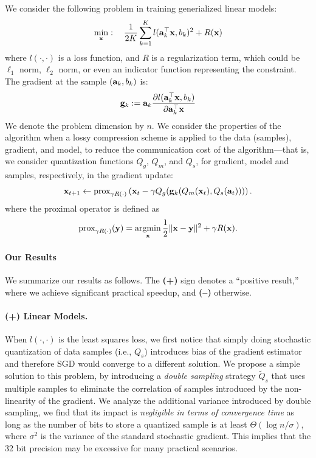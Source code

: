 \documentclass{article}
\renewcommand{\vec}[1]{\mathbf{#1}}
\def\a{{\bf a}}
\def\g{{\bf g}}
\def\x{{\bf x}}
\def\y{{\bf y}}
\DeclareMathOperator*{\argmin}{argmin}
\begin{document}
We consider the following problem in training generialized linear models: 
\begin{align}
\min_{\x}:\quad {1\over 2K}\sum_{k=1}^K l(\a_k^\top \x, b_k)^2 + R(\x)
\label{eqn:leastsquares}
\end{align}
where $l(\cdot,\cdot)$ is a loss function, and $R$ is a regularization term, which could be $\ell_1$ norm, $\ell_2$ norm, or even an indicator function representing the constraint. 
The gradient at the sample $(\a_k, b_k)$ is: 
\[
\g_k := \a_k \frac{\partial l(\a_k^\top \x, b_k)}{\partial \a_k^\top \x} 
\]
We denote the problem dimension by $n$. 
We consider the properties of the algorithm when a lossy compression scheme is applied to the data (samples), 
gradient, and model, to reduce the communication cost of the algorithm---that is, we consider quantization functions $Q_g$, $Q_m$, and $Q_s$, for gradient, model and samples, respectively, in the gradient update:
\begin{align}
\x_{t + 1} \leftarrow \text{prox}_{\gamma R(\cdot)}\left(\x_t - \gamma Q_g(\g_k (Q_m(\x_t), Q_s(\vec{a}_t)))\right).
\label{eq:proxupdate}
\end{align}
where the proximal operator is defined as
\[
\text{prox}_{\gamma R(\cdot)}(\y) =\argmin_{\x} {1\over 2}\|\x-\y\|^2 + \gamma R(\x).
\]

\paragraph{Our Results} We summarize our results as follows. The {\bf (+)}
sign denotes a ``positive result,'' where we achieve
significant practical speedup, and {\bf (--)} otherwise.

\paragraph{(+) Linear Models.} When $l(\cdot,\cdot)$ is 
the least squares loss, we first notice that
simply doing stochastic quantization of data samples  
(i.e., $Q_s$) introduces bias of the gradient
estimator and therefore SGD would converge
to a different solution. We propose a simple
solution to this problem, by introducing a
{\em double sampling} strategy
$\tilde{Q}_s$ that uses multiple samples to
eliminate the correlation of samples introduced
by the non-linearity of the gradient. We
analyze the additional variance introduced
by double sampling, we find that its impact is \emph{negligible in terms of convergence time} as long as the 
number of bits to store a quantized sample is at least $\Theta( \log n / \sigma )$, 
where $\sigma^2$ is the variance of the standard stochastic gradient. 
This implies that the 32 bit precision may be excessive for many practical scenarios. 
\end{document}
